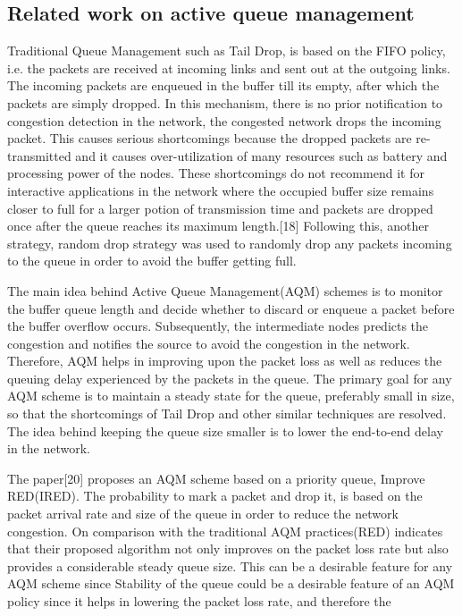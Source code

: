 \subsection{Related work on active queue management}
Traditional Queue Management such as Tail Drop, is based on the FIFO policy, i.e. the packets are received at incoming links and sent out at the outgoing links. The incoming packets are enqueued in the buffer till its empty, after which the packets are simply dropped. In this mechanism, there is no prior notification to congestion detection in the network, the congested network drops the incoming packet. This causes serious shortcomings because the dropped packets are re-transmitted and it causes over-utilization of many resources such as battery and processing power of the nodes. These shortcomings do not recommend it for interactive applications in the network where the occupied buffer size remains closer to full for a larger potion of transmission time and packets are dropped once after the queue reaches its maximum length.[18] Following this, another strategy, random drop strategy was used to randomly drop any packets incoming to the queue in order to avoid the buffer getting full. 
\par
The main idea behind Active Queue Management(AQM) schemes is to monitor the buffer queue length and decide whether to discard or enqueue a packet before the buffer overflow occurs. Subsequently, the intermediate nodes predicts the congestion and notifies the source to avoid the congestion in the network. Therefore, AQM helps in improving upon the packet loss as well as reduces the queuing delay experienced by the packets in the queue. The primary goal for any AQM scheme is to maintain a steady state for the queue, preferably small in size, so that the shortcomings of Tail Drop and other similar techniques are resolved. The idea behind keeping the queue size smaller is to lower the end-to-end delay in the network.
\par
The paper[20] proposes an AQM scheme based on a priority queue, Improve RED(IRED). The probability to mark a packet and drop it, is based on the packet arrival rate and size of the queue in order to reduce the network congestion. On comparison with the traditional AQM practices(RED) indicates that their proposed algorithm not only improves on the packet loss rate but also provides a considerable steady queue size. This can be a desirable feature for any AQM scheme since 
Stability of the queue could be a desirable feature of an AQM policy since it helps in lowering the packet loss rate, and therefore the
